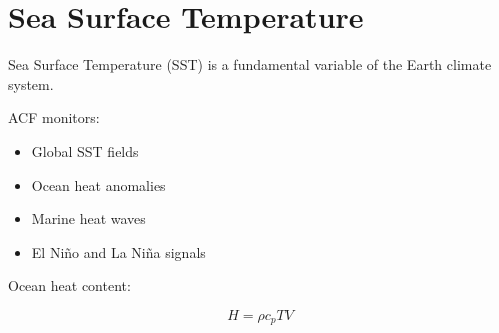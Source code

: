 \section{Sea Surface Temperature}


Sea Surface Temperature (SST) is a fundamental variable of the
Earth climate system.



ACF monitors:


\begin{itemize}

\item Global SST fields

\item Ocean heat anomalies

\item Marine heat waves

\item El Niño and La Niña signals

\end{itemize}



Ocean heat content:


\[
H=\rho c_p T V
\]


